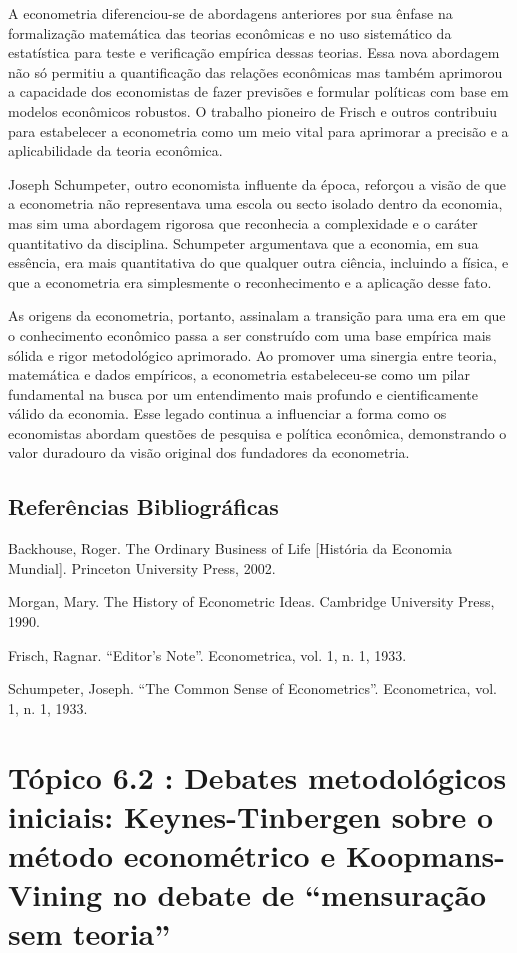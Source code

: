 \documentclass[a4paper,12pt]{article}[abntex2]
\begin{document}
A econometria diferenciou-se de abordagens anteriores por sua ênfase na formalização matemática das teorias econômicas e no uso sistemático da estatística para teste e verificação empírica dessas teorias. Essa nova abordagem não só permitiu a quantificação das relações econômicas mas também aprimorou a capacidade dos economistas de fazer previsões e formular políticas com base em modelos econômicos robustos. O trabalho pioneiro de Frisch e outros contribuiu para estabelecer a econometria como um meio vital para aprimorar a precisão e a aplicabilidade da teoria econômica.

Joseph Schumpeter, outro economista influente da época, reforçou a visão de que a econometria não representava uma escola ou secto isolado dentro da economia, mas sim uma abordagem rigorosa que reconhecia a complexidade e o caráter quantitativo da disciplina. Schumpeter argumentava que a economia, em sua essência, era mais quantitativa do que qualquer outra ciência, incluindo a física, e que a econometria era simplesmente o reconhecimento e a aplicação desse fato.

As origens da econometria, portanto, assinalam a transição para uma era em que o conhecimento econômico passa a ser construído com uma base empírica mais sólida e rigor metodológico aprimorado. Ao promover uma sinergia entre teoria, matemática e dados empíricos, a econometria estabeleceu-se como um pilar fundamental na busca por um entendimento mais profundo e cientificamente válido da economia. Esse legado continua a influenciar a forma como os economistas abordam questões de pesquisa e política econômica, demonstrando o valor duradouro da visão original dos fundadores da econometria.


\subsection{\textbf{Referências Bibliográficas}}
Backhouse, Roger. The Ordinary Business of Life [História da Economia Mundial]. Princeton
University Press, 2002.

Morgan, Mary. The History of Econometric Ideas. Cambridge University Press, 1990.

Frisch, Ragnar. “Editor’s Note”. Econometrica, vol. 1, n. 1, 1933.

Schumpeter, Joseph. “The Common Sense of Econometrics”. Econometrica, vol. 1, n. 1,
1933.

\section{\textbf{Tópico 6.2 : Debates metodológicos iniciais: Keynes-Tinbergen sobre o método econométrico e Koopmans-Vining no debate de “mensuração sem teoria”}}
\end{document}
